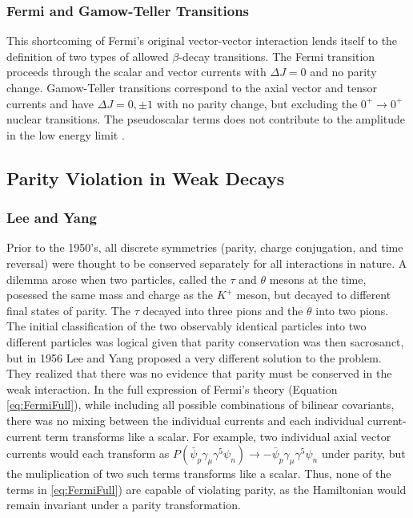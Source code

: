 \subsubsection{Fermi and Gamow-Teller Transitions}

This shortcoming of Fermi's original vector-vector interaction
lends itself to the definition of
two types of allowed $\beta$-decay transitions. The Fermi transition proceeds through the
scalar and vector currents with $\Delta J=0$ and no parity change. Gamow-Teller transitions
correspond to the axial vector and tensor currents and have $\Delta J=0,\pm1$ with no parity change,
but excluding the $0^+\rightarrow 0^+$ nuclear transitions. The pseudoscalar terms does not
contribute to the amplitude in the low energy limit \cite{renton1990}.
 

\subsection{Parity Violation in Weak Decays}

\subsubsection{Lee and Yang}

Prior to the 1950's, all discrete symmetries (parity, charge conjugation, and time reversal)
were thought to be conserved separately for all interactions in nature. A dilemma arose when
two particles, called the $\tau$ and $\theta$ mesons at the time, posessed the same mass
and charge as the $K^+$ meson, but decayed to different final states of parity. The $\tau$ decayed into three pions
and the $\theta$ into two pions. The initial classification of the two observably identical particles into
two different particles was logical given that parity conservation was then sacrosanct,
but in 1956 Lee and Yang proposed a very different solution to the problem. They realized that
there was no evidence that parity must be conserved in the weak interaction.
In the full expression of Fermi's theory (Equation \ref{eq:FermiFull}),
while including all possible combinations of bilinear covariants, there was no mixing between the
individual currents and each individual current-current term transforms like a scalar. For example,
two individual axial vector currents would each transform as
$P(\bar{\psi}_p \gamma_\mu \gamma^5 \psi_n) \rightarrow -\bar{\psi}_p \gamma_\mu \gamma^5 \psi_n$ under parity, but the
muliplication of two such terms transforms like a scalar. Thus, none of the terms in \ref{eq:FermiFull})
are capable of violating parity, as the Hamiltonian would remain invariant under a parity transformation. 

